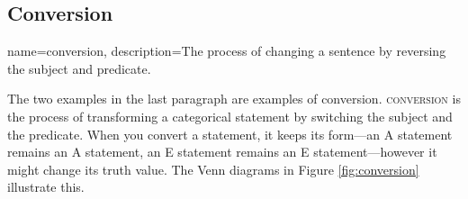 \subsection{Conversion}

{
name=conversion,
description={The process of changing a sentence by reversing the subject and predicate.}
}


The two examples in the last paragraph are examples of conversion. \textsc{\gls{conversion}} \label{defConversion} is the process of transforming a categorical statement by switching the subject and the predicate. When you convert a statement, it keeps its form---an A statement remains an A statement, an E statement remains an E statement---however it might change its truth value.  The Venn diagrams in Figure \ref{fig:conversion} illustrate this.

